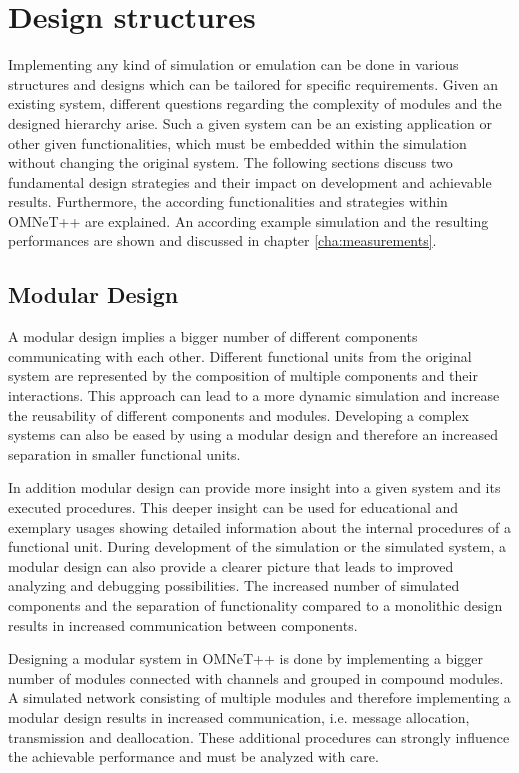 \chapter{Design structures}
\label{cha:design}
Implementing any kind of simulation or emulation can be done in various structures and designs which can be tailored for specific requirements.
Given an existing system, different questions regarding the complexity of modules and the designed hierarchy arise.
Such a given system can be an existing application or other given functionalities, which must be embedded within the simulation without changing the original system.
The following sections discuss two fundamental design strategies and their impact on development and achievable results.
Furthermore, the according functionalities and strategies within OMNeT++ are explained.
An according example simulation and the resulting performances are shown and discussed in chapter \ref{cha:measurements}.

\section{Modular Design}
\label{sec:design_modular}
A modular design implies a bigger number of different components communicating with each other.
Different functional units from the original system are represented by the composition of multiple components and their interactions.
This approach can lead to a more dynamic simulation and increase the reusability of different components and modules.
Developing a complex systems can also be eased by using a modular design and therefore an increased separation in smaller functional units.

In addition modular design can provide more insight into a given system and its executed procedures.
This deeper insight can be used for educational and exemplary usages showing detailed information about the internal procedures of a functional unit.
During development of the simulation or the simulated system, a modular design can also provide a clearer picture that leads to improved analyzing and debugging possibilities.
The increased number of simulated components and the separation of functionality compared to a monolithic design results in increased communication between components.

Designing a modular system in OMNeT++ is done by implementing a bigger number of modules connected with channels and grouped in compound modules.
A simulated network consisting of multiple modules and therefore implementing a modular design results in increased communication, i.e. message allocation, transmission and deallocation.
These additional procedures can strongly influence the achievable performance and must be analyzed with care.

